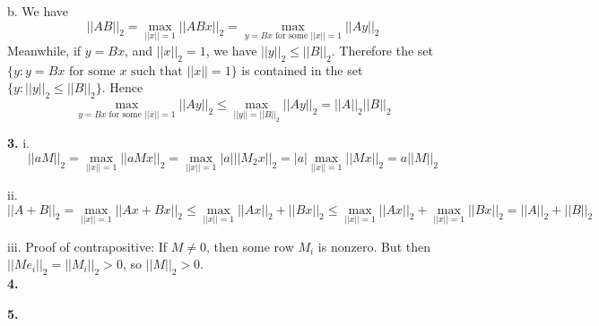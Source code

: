 \documentclass[11pt]{article}
\begin{document}
b.
We have
\[
||AB||_2 = \max_{||x|| = 1} ||ABx||_2 = \max_{y = Bx\text{ for some }||x|| = 1} ||Ay||_2
\]
Meanwhile, if $y = Bx$, and $||x||_2 = 1$, we have $||y||_2 \leq ||B||_2$.
Therefore the set
$\{y: y = Bx \text{ for some }x\text{ such that }||x||=1\}$
is contained in the set
$\{y: ||y||_2 \leq ||B||_2\}$.
Hence
\[
\max_{y = Bx\text{ for some }||x|| = 1} ||Ay||_2 \leq
\max_{||y|| = ||B||_2} ||Ay||_2 = ||A||_2 ||B||_2
\]

\noindent\textbf{3.}
i. 
\[
||aM||_2 = \max_{||x||=1} ||aMx||_2 = \max_{||x||=1} |a| ||M_2 x||_2 = |a|\max_{||x||=1} ||M x||_2 = a||M||_2
\]

ii.
\[
||A + B||_2 = \max_{||x|| = 1} ||Ax + Bx||_2 \leq \max_{||x||=1} ||Ax||_2 + ||Bx||_2
\leq \max_{||x|| = 1} ||Ax||_2 + \max_{||x||=1} ||Bx||_2 = ||A||_2 + ||B||_2
\]

iii.
Proof of contrapositive:
If $M \neq 0$, then some row $M_i$ is nonzero.
But then $||Me_i||_2 = ||M_i||_2 > 0$, so $||M||_2 > 0$.\\


\noindent\textbf{4.}

\noindent\textbf{5.}
\end{document}
